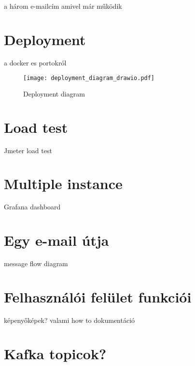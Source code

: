 a három e-mailcím amivel már működik


\section{Deployment}
a docker es portokról 

\begin{figure}[hbt] 
	\centering
	\texttt{[image: deployment\_diagram\_drawio.pdf]}
	\caption[Deployment diagram]{Deployment diagram}\label{fig:deployment_diagram}
\end{figure}


\section{Load test}
Jmeter load test

\section{Multiple instance}
Grafana dashboard

\section{Egy e-mail útja}
message flow diagram

\section{Felhasználói felület funkciói}
 képenyőképek? valami how to dokumentáció	

\section{Kafka topicok?}